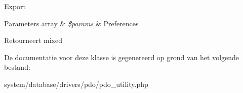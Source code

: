Export


\begin{DoxyParams}[1]{Parameters}
array & {\em \$params} & Preferences \\
\hline
\end{DoxyParams}
\begin{DoxyReturn}{Retourneert}
mixed 
\end{DoxyReturn}


De documentatie voor deze klasse is gegenereerd op grond van het volgende bestand\+:\begin{DoxyCompactItemize}
\item 
system/database/drivers/pdo/pdo\+\_\+utility.\+php\end{DoxyCompactItemize}

